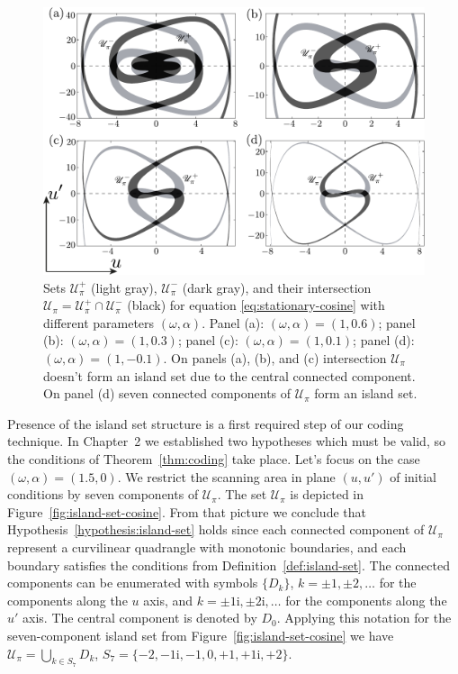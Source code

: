 \begin{figure}[h]
\centering
	\includegraphics[scale = 1]{pic/island set emergence for cosine equation}
	\caption{
		Sets $\mathscr{U}_{\pi}^+$ (light gray), $\mathscr{U}_{\pi}^-$ (dark gray), and their intersection $\mathscr{U}_{\pi} = \mathscr{U}_{\pi}^+ \cap \mathscr{U}_{\pi}^-$ (black) for equation \eqref{eq:stationary-cosine} with different parameters $(\omega, \alpha)$.
		Panel (a): $(\omega, \alpha) = (1, 0.6)$; panel (b): $(\omega, \alpha) = (1, 0.3)$; panel (c): $(\omega, \alpha) = (1, 0.1)$; panel (d): $(\omega, \alpha) = (1, -0.1)$.
		On panels (a), (b), and (c) intersection $\mathscr{U}_{\pi}$ doesn't form an island set due to the central connected component.
		On panel (d) seven connected components of $\mathscr{U}_{\pi}$ form an island set.
	}
\label{fig:island-set-emergence-cosine}
\end{figure}

Presence of the island set structure is a first required step of our coding technique.
In Chapter~2 we established two hypotheses which must be valid, so the conditions of Theorem~\ref{thm:coding} take place.
Let's focus on the case $(\omega, \alpha) = (1.5, 0)$.
We restrict the scanning area in plane $(u, u')$ of initial conditions by seven components of $\mathscr{U}_{\pi}$.
The set $\mathscr{U}_{\pi}$ is depicted in Figure~\ref{fig:island-set-cosine}.
From that picture we conclude that Hypothesis~\ref{hypothesis:island-set} holds since each connected component of $\mathscr{U}_{\pi}$ represent a curvilinear quadrangle with monotonic boundaries, and each boundary satisfies the conditions from Definition~\ref{def:island-set}.
The connected components can be enumerated with symbols $\{D_k\}$, $k = \pm 1, \pm 2, \dots$ for the components along the $u$ axis, and $k = \pm 1\mathrm{i}, \pm 2\mathrm{i}, \dots$ for the components along the $u'$ axis.
The central component is denoted by $D_0$.
Applying this notation for the seven-component island set from Figure~\ref{fig:island-set-cosine} we have $\mathscr{U}_{\pi} = \bigcup_{k \in S_7} D_k$, $S_7 = \{ -2, -1\mathrm{i}, -1, 0, +1, +1\mathrm{i}, +2 \}$.

